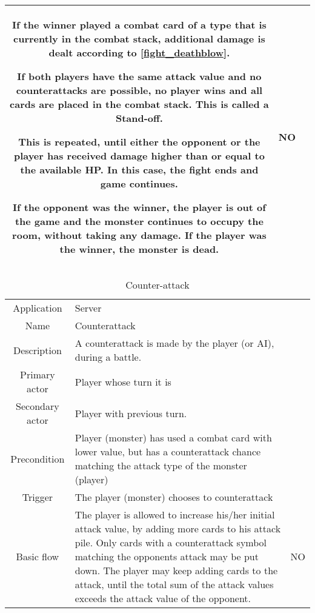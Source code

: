 \begin{table}
\begin{tabular}{|c| p{9cm}|c}
If the winner played a combat card of a type that is currently in the combat stack, additional damage is dealt according to \ref{fight_deathblow}.

If both players have the same attack value and no counterattacks are possible, no player wins and all cards are placed in the combat stack. This is called a Stand-off.

This is repeated, until either the opponent or the player has received damage higher than or equal to the available HP. In this case, the fight ends and game continues.

If the opponent was the winner, the player is out of the game and the monster continues to occupy the room, without taking any damage. If the player was the winner, the monster is dead.

& NO \\



\hline
\end{tabular}
\end{table}

\begin{table}
\caption{Counter-attack}
\label{fight_counterattack}
\begin{tabular}{|c| p{9cm}|c}
\hline
Application & Server & \\
Name & Counterattack & \\
Description & A counterattack is made by the player (or AI), during a battle. & \\
Primary actor & Player whose turn it is & \\
Secondary actor & Player with previous turn.& \\
Precondition & Player (monster) has used a combat card with lower value, but has a counterattack chance matching the attack type of the monster (player)& \\
Trigger & The player (monster) chooses to counterattack  & \\ \hline
Basic flow & The player is allowed to increase his/her initial attack value, by adding more cards to his attack pile. Only cards with a counterattack symbol matching the opponents attack may be put down. The player may keep adding cards to the attack, until the total sum of the attack values exceeds the attack value of the opponent.& NO\\
\hline
\end{tabular}
\end{table}


